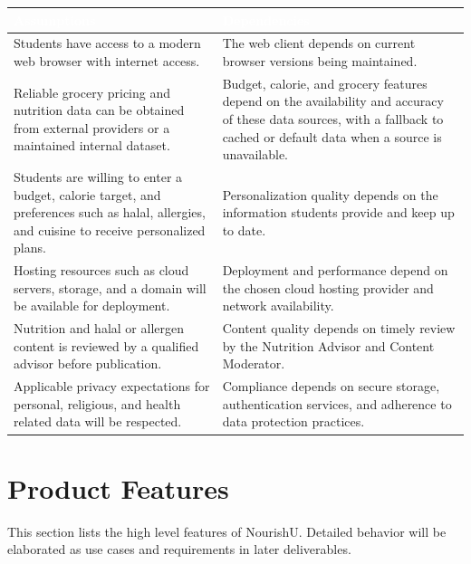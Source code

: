 \documentclass[11pt,a4paper]{article}
\begin{document}
\begin{tabularx}{\textwidth}{Y Y}
\toprule
{}\textcolor{white}{\textbf{Assumptions}} & \textcolor{white}{\textbf{Dependencies}} \\
\midrule
Students have access to a modern web browser with internet access. & The web client depends on current browser versions being maintained. \\
Reliable grocery pricing and nutrition data can be obtained from external providers or a maintained internal dataset. & Budget, calorie, and grocery features depend on the availability and accuracy of these data sources, with a fallback to cached or default data when a source is unavailable. \\
Students are willing to enter a budget, calorie target, and preferences such as halal, allergies, and cuisine to receive personalized plans. & Personalization quality depends on the information students provide and keep up to date. \\
Hosting resources such as cloud servers, storage, and a domain will be available for deployment. & Deployment and performance depend on the chosen cloud hosting provider and network availability. \\
Nutrition and halal or allergen content is reviewed by a qualified advisor before publication. & Content quality depends on timely review by the Nutrition Advisor and Content Moderator. \\
Applicable privacy expectations for personal, religious, and health related data will be respected. & Compliance depends on secure storage, authentication services, and adherence to data protection practices. \\
\bottomrule
\end{tabularx}

\section{Product Features}

This section lists the high level features of NourishU. Detailed behavior will be elaborated as use cases and requirements in later deliverables.
\end{document}
